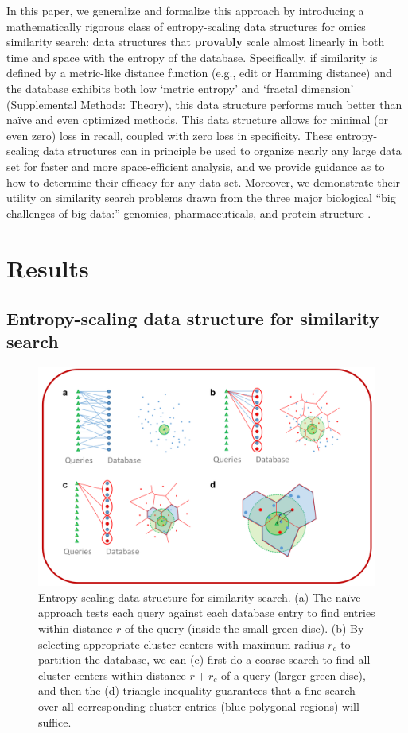 \documentclass[review,preprint,12pt]{elsarticle}
\renewcommand{\cite}{\citep} %
\theoremstyle{definition}
\theoremstyle{remark}
\numberwithin{equation}{section}
\begin{document}
In this paper, we generalize and formalize this approach by introducing 
a mathematically rigorous class of entropy-scaling data structures for 
omics similarity search: data structures that \textbf{provably} scale almost linearly in both time and space with the entropy of the database.
Specifically, if similarity is defined by a metric-like distance function (e.g., edit or Hamming distance) and the database exhibits both low `metric entropy' and `fractal dimension' (Supplemental Methods: Theory), this data structure performs much better than na\"ive and even optimized methods.
This data structure allows for minimal (or even zero) loss in recall, coupled
with zero loss in specificity.
These entropy-scaling data structures can in principle be used to organize nearly any large data set for faster and more space-efficient analysis,
and we provide guidance as to how to determine their efficacy for any data set.
Moreover, we demonstrate their utility on similarity search problems drawn from the three major biological ``big challenges of big data:'' genomics, pharmaceuticals, and protein structure \cite{marx2013biology}.

\section{Results}

\subsection{Entropy-scaling data structure for similarity search}

\begin{figure}[p]
    \centering
    \centerline{\includegraphics[width=8in]{assets/dataStructure.png}}
    \caption{ Entropy-scaling data structure for similarity search. %
            (a) The na\"ive approach tests each query against each database entry to find entries within distance $r$ of the query (inside the small green disc). %
            (b) By selecting appropriate cluster centers with maximum radius $r_c$ to partition the database, we can (c) first do a coarse search to find all cluster centers within distance $r+r_c$ of a query (larger green disc), %
 and then the (d) triangle inequality guarantees that a fine search over all corresponding cluster entries (blue polygonal regions) will suffice.}
    \label{fig:dataStructure}
\end{figure}
\end{document}
